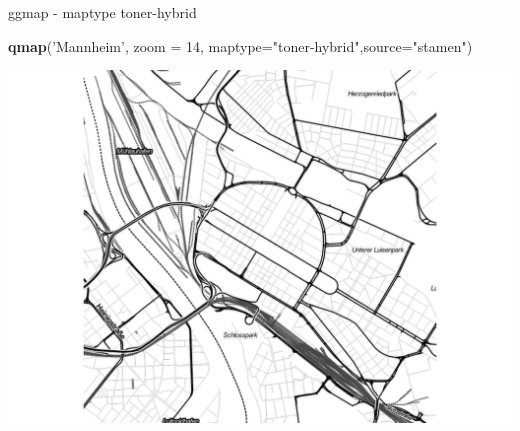 \documentclass[ignorenonframetext,]{beamer}
\newenvironment{Shaded}{}{}
\newcommand{\KeywordTok}[1]{\textcolor[rgb]{0.00,0.44,0.13}{\textbf{{#1}}}}
\newcommand{\DataTypeTok}[1]{\textcolor[rgb]{0.56,0.13,0.00}{{#1}}}
\newcommand{\DecValTok}[1]{\textcolor[rgb]{0.25,0.63,0.44}{{#1}}}
\newcommand{\StringTok}[1]{\textcolor[rgb]{0.25,0.44,0.63}{{#1}}}
\newcommand{\NormalTok}[1]{{#1}}
\begin{document}
\begin{frame}[fragile]{ggmap - maptype toner-hybrid}

\begin{Shaded}
\begin{Highlighting}[]
\KeywordTok{qmap}\NormalTok{(}\StringTok{'Mannheim'}\NormalTok{, }\DataTypeTok{zoom =} \DecValTok{14}\NormalTok{,}
 \DataTypeTok{maptype=}\StringTok{"toner-hybrid"}\NormalTok{,}\DataTypeTok{source=}\StringTok{"stamen"}\NormalTok{)}
\end{Highlighting}
\end{Shaded}

\includegraphics{R_intern_files/figure-beamer/unnamed-chunk-274-1.pdf}

\end{frame}
\end{document}
